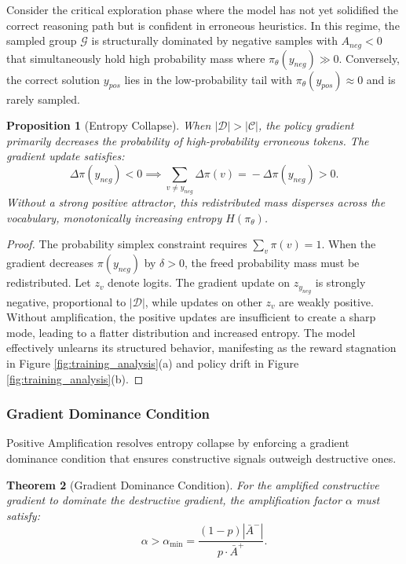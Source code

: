 \documentclass[11pt]{article}
\newtheorem{theorem}{Theorem}
\newtheorem{proposition}[theorem]{Proposition}
\theoremstyle{definition}
\theoremstyle{remark}
\begin{document}
Consider the critical exploration phase where the model has not yet solidified the correct reasoning path but is confident in erroneous heuristics. In this regime, the sampled group $\mathcal{G}$ is structurally dominated by negative samples with $A_{neg} < 0$ that simultaneously hold high probability mass where $\pi_\theta(y_{neg}) \gg 0$. Conversely, the correct solution $y_{pos}$ lies in the low-probability tail with $\pi_\theta(y_{pos}) \approx 0$ and is rarely sampled.

\begin{proposition}[Entropy Collapse]
\label{prop:entropy_collapse}
When $|\mathcal{D}| > |\mathcal{C}|$, the policy gradient primarily decreases the probability of high-probability erroneous tokens. The gradient update satisfies:
\begin{equation}
\Delta\pi(y_{neg}) \!\! < \!\! 0 \!\! \implies \!\! \sum_{v \neq y_{neg}} \!\! \Delta\pi(v) \!\! = \!\! -\Delta\pi(y_{neg}) \!\! > \!\! 0 .
\end{equation}
Without a strong positive attractor, this redistributed mass disperses across the vocabulary, monotonically increasing entropy $H(\pi_\theta)$.
\end{proposition}

\begin{proof}
The probability simplex constraint requires $\sum_v \pi(v) = 1$. When the gradient decreases $\pi(y_{neg})$ by $\delta > 0$, the freed probability mass must be redistributed. Let $z_v$ denote logits. The gradient update on $z_{y_{neg}}$ is strongly negative, proportional to $|\mathcal{D}|$, while updates on other $z_v$ are weakly positive. Without amplification, the positive updates are insufficient to create a sharp mode, leading to a flatter distribution and increased entropy. The model effectively unlearns its structured behavior, manifesting as the reward stagnation in Figure \ref{fig:training_analysis}(a) and policy drift in Figure \ref{fig:training_analysis}(b).
\end{proof}

\subsubsection{Gradient Dominance Condition}
\label{sec:gradient_dominance}

Positive Amplification resolves entropy collapse by enforcing a gradient dominance condition that ensures constructive signals outweigh destructive ones.

\begin{theorem}[Gradient Dominance Condition]
\label{thm:gradient_dominance}
For the amplified constructive gradient to dominate the destructive gradient, the amplification factor $\alpha$ must satisfy:
\begin{equation}
\alpha > \alpha_{\min} = \frac{(1-p)|\bar{A}^-|}{p \cdot \bar{A}^+}.
\end{equation}
\end{theorem}
\end{document}

